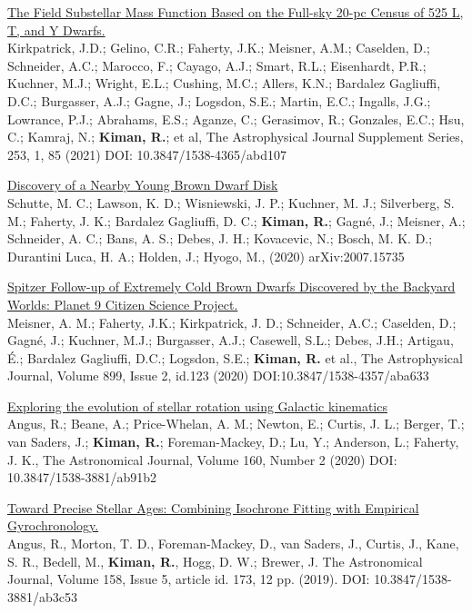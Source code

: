 \documentclass[10pt]{cv}
\begin{document}
\begin{llist}
\begin{etaremune}
  \item \href{https://ui.adsabs.harvard.edu/abs/2021ApJS..253....7K/abstract}{The Field Substellar Mass Function Based on the Full-sky 20-pc Census of 525 L, T, and Y Dwarfs.}\\ Kirkpatrick, J.D.; Gelino, C.R.; Faherty, J.K.; Meisner, A.M.; Caselden, D.; Schneider, A.C.; Marocco, F.; Cayago, A.J.; Smart, R.L.; Eisenhardt, P.R.; Kuchner, M.J.; Wright, E.L.; Cushing, M.C.; Allers, K.N.; Bardalez Gagliuffi, D.C.; Burgasser, A.J.; Gagne, J.; Logsdon, S.E.; Martin, E.C.; Ingalls, J.G.; Lowrance, P.J.; Abrahams, E.S.; Aganze, C.; Gerasimov, R.; Gonzales, E.C.; Hsu, C.; Kamraj, N.; \textbf{​Kiman, R.}​; et al, The Astrophysical Journal Supplement Series, 253, 1, 85 (2021) DOI: 10.3847/1538-4365/abd107

  \item \href{https://ui.adsabs.harvard.edu/abs/2020AJ....160..156S/abstract}{Discovery of a Nearby Young Brown Dwarf Disk}\\ Schutte, M. C.; Lawson, K. D.; Wisniewski, J. P.; Kuchner, M. J.; Silverberg, S. M.; Faherty, J. K.; Bardalez Gagliuffi, D. C.; \textbf{Kiman, R.}; Gagné, J.; Meisner, A.; Schneider, A. C.; Bans, A. S.; Debes, J. H.; Kovacevic, N.; Bosch, M. K. D.; Durantini Luca, H. A.; Holden, J.; Hyogo, M., (2020) arXiv:2007.15735

  \item \href{https://ui.adsabs.harvard.edu/abs/2020ApJ...899..123M/abstract}{Spitzer Follow-up of Extremely Cold Brown Dwarfs Discovered by the Backyard Worlds: Planet 9 Citizen Science Project.}\\ Meisner, A. M.; Faherty, J.K.; Kirkpatrick, J. D.; Schneider, A.C.; Caselden, D.; Gagné, J.; Kuchner, M.J.; Burgasser, A.J.; Casewell, S.L.; Debes, J.H.; Artigau, É.; Bardalez Gagliuffi, D.C.; Logsdon, S.E.; \textbf{Kiman, R.} et al., The Astrophysical Journal, Volume 899, Issue 2, id.123 (2020) DOI:10.3847/1538-4357/aba633

  \item \href{https://ui.adsabs.harvard.edu/abs/2020AJ....160...90A/abstract}{Exploring the evolution of stellar rotation using Galactic kinematics}\\ Angus, R.; Beane, A.; Price-Whelan, A. M.; Newton, E.; Curtis, J. L.; Berger, T.; van Saders, J.; \textbf{Kiman, R.}; Foreman-Mackey, D.; Lu, Y.; Anderson, L.; Faherty, J. K., The Astronomical Journal, Volume 160, Number 2 (2020) DOI: 10.3847/1538-3881/ab91b2

  \item \href{https://ui.adsabs.harvard.edu/abs/2019AJ....158..173A/abstract}{Toward Precise Stellar Ages: Combining Isochrone Fitting with Empirical Gyrochronology.}\\  Angus, R., Morton, T. D., Foreman-Mackey, D., van Saders, J., Curtis, J., Kane, S. R., Bedell, M., \textbf{Kiman, R.}, Hogg, D. W.; Brewer, J. The Astronomical Journal, Volume 158, Issue 5, article id. 173, 12 pp. (2019). DOI: 10.3847/1538-3881/ab3c53
\end{etaremune}


\end{llist}
\end{document}
